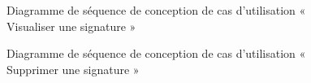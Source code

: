 \begin{figure}[H]
  \centering
  \caption{Diagramme de séquence de conception de cas d'utilisation « Visualiser une signature  »}
  \label{fig:sequence_conception_view_signature}
\end{figure}

\begin{figure}[H]
  \centering
  \caption{Diagramme de séquence de conception de cas d'utilisation « Supprimer une signature  »}
  \label{fig:sequence_conception_delete_signature}
\end{figure}

